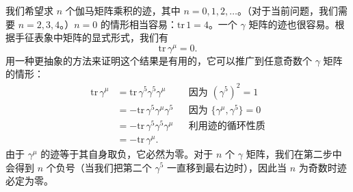 我们希望求 $n$ 个伽马矩阵乘积的迹，其中 $n = 0, 1, 2, \ldots$。（对于当前问题，我们需要 $n = 2, 3, 4$。）$n=0$ 的情形相当容易：$\mathrm{tr}\,1 = 4$。一个 $\gamma$ 矩阵的迹也很容易。根据手征表象中矩阵的显式形式，我们有
\begin{equation}
  \mathrm{tr}\,\gamma^\mu = 0 .
\end{equation}
用一种更抽象的方法来证明这个结果是有用的，它可以推广到任意奇数个 $\gamma$ 矩阵的情形：
\begin{equation}
  \begin{aligned}
    \mathrm{tr}\,\gamma^\mu &= \mathrm{tr}\,\gamma^5\gamma^5\gamma^\mu
      &&\text{因为 } (\gamma^5)^2 = 1\\
    &= -\mathrm{tr}\,\gamma^5\gamma^\mu\gamma^5 &&\text{因为 }
      \{\gamma^\mu, \gamma^5\} = 0\\
    &= -\mathrm{tr}\,\gamma^5\gamma^5\gamma^\mu
      &&\text{利用迹的循环性质}\\
    &= -\mathrm{tr}\,\gamma^\mu .
  \end{aligned}
\end{equation}
由于 $\gamma^\mu$ 的迹等于其自身取负，它必然为零。对于 $n$ 个 $\gamma$ 矩阵，我们在第二步中会得到 $n$ 个负号（当我们把第二个 $\gamma^5$ 一直移到最右边时），因此当 $n$ 为奇数时迹必定为零。

